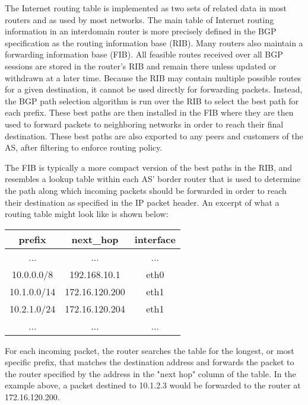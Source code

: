 The Internet routing table is implemented as two sets of related data in most routers and as used by most networks. The main table of Internet routing information in an interdomain router is more precisely defined in the BGP specification \cite{rfc4271} as the routing information base (RIB). Many routers also maintain a forwarding information base (FIB). All feasible routes received over all BGP sessions are stored in the router's RIB and remain there unless updated or withdrawn at a later time. Because the RIB may contain multiple possible routes for a given destination, it cannot be used directly for forwarding packets. Instead, the BGP path selection algorithm is run over the RIB to select the best path for each prefix. These best paths are then installed in the FIB where they are then used to forward packets to neighboring networks in order to reach their final destination. These best paths are also exported to any peers and customers of the AS, after filtering to enforce routing policy.

The FIB is typically a more compact version of the best paths in the RIB, and resembles a lookup table within each AS' border router that is used to determine the path along which incoming packets should be forwarded in order to reach their destination as specified in the IP packet header. An excerpt of what a routing table might look like is shown below:

\begin{center}
\begin{singlespace}
    \begin{tabular}{c | c | c}
        prefix & next\_hop & interface \\
        \hline
        ... & ... & ... \\
        10.0.0.0/8  & 192.168.10.1   & eth0 \\
        10.1.0.0/14 & 172.16.120.200 & eth1 \\
        10.2.1.0/24 & 172.16.120.204 & eth1 \\
        ... & ... & ...
    \end{tabular}
\end{singlespace}
\end{center}

For each incoming packet, the router searches the table for the longest, or most specific prefix, that matches the destination address and forwards the packet to the router specified by the address in the "next hop" column of the table. In the example above, a packet destined to 10.1.2.3 would be forwarded to the router at 172.16.120.200.

